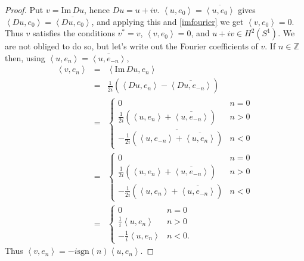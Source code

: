 \documentclass{article}
\newcommand{\inner}[2]{\left\langle #1, #2 \right\rangle}
\def\Im{\ensuremath{\mathrm{Im}}\,}
\newcommand{\sgn}{\textrm{sgn}}
\begin{document}
\begin{proof}
Put $v = \Im Du$, hence $Du=u+iv$. $\inner{u}{e_0}=\overline{\inner{u}{e_0}}$ gives
 $\inner{Du}{e_0}=\overline{\inner{Du}{e_0}}$, and applying this and  
 \eqref{imfourier} we get $\inner{v}{e_0}=0$. Thus $v$ satisfies the conditions $v^*=v$, $\inner{v}{e_0}=0$, and $u+iv \in H^2(S^1)$.
We are not obliged to do so, but let's write out the Fourier coefficients of $v$. 
If $n \in \mathbb{Z}$ then, using $\inner{u}{e_n}=\overline{\inner{u}{e_{-n}}}$,
\begin{eqnarray*}
\inner{v}{e_n}&=& \inner{\Im Du}{e_n}\\
&=&\frac{1}{2i}  \left(  \inner{Du}{e_n} -  \overline{\inner{Du}{e_{-n}}}\right)\\
&=&\begin{cases}
0&n=0\\
\frac{1}{2i}\left( \inner{u}{e_n}+\overline{\inner{u}{e_{-n}}} \right)&n>0\\
-\frac{1}{2i} \overline{\left( \inner{u}{e_{-n}}+\overline{\inner{u}{e_n}} \right)}&n<0 
\end{cases}\\
&=&\begin{cases}
0&n=0\\
\frac{1}{2i}\left( \inner{u}{e_n}+\overline{\inner{u}{e_{-n}}} \right)&n>0\\
-\frac{1}{2i}\left( \inner{u}{e_n}+\overline{\inner{u}{e_{-n}}} \right)&n<0
\end{cases}\\
&=&\begin{cases}
0&n=0\\
\frac{1}{i} \inner{u}{e_n}&n>0\\
-\frac{1}{i} \inner{u}{e_n}&n<0.
\end{cases}
\end{eqnarray*}
Thus $\inner{v}{e_n}=-i\sgn(n) \inner{u}{e_n}$.


\end{proof}
\end{document}
